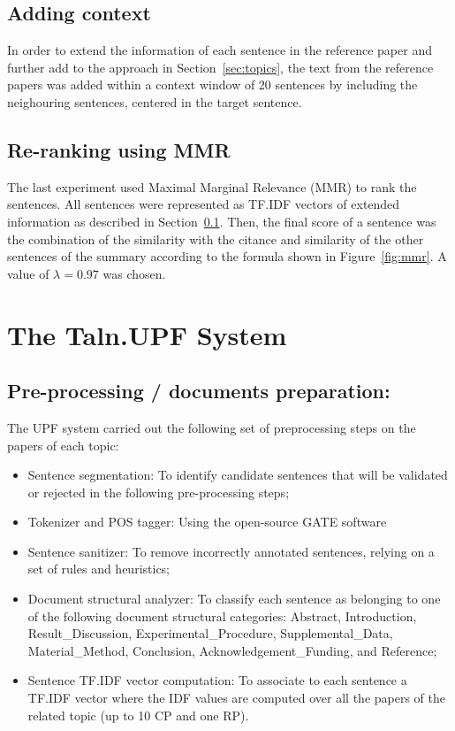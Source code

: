 \documentclass[11pt]{article}
\begin{document}
\subsection{Adding context}
\label{sec:context}
In order to  extend the information of each sentence in the reference paper 
and further add to the approach in Section~\ref{sec:topics}, the text from 
the reference papers was added within a context window of 20 sentences by 
including the neighouring sentences, centered in the target sentence.


\subsection{Re-ranking using MMR}
\label{sec:mmr}
The last experiment used Maximal Marginal Relevance (MMR) \cite{Carbonell:1998} 
to rank the sentences. All sentences were represented as TF.IDF vectors 
of extended information as described in Section~\ref{sec:context}. Then, the 
final score of a sentence was the combination of the similarity with the 
citance and similarity of the other sentences of the summary according to the 
formula shown in Figure~\ref{fig:mmr}. A value of $\lambda=0.97$ was chosen.

\section{The Taln.UPF System}

\subsection{Pre-processing / documents preparation:}
The UPF system carried out the following set of preprocessing steps on the 
papers of each topic:
\begin{itemize}
\item{Sentence segmentation:} To identify candidate sentences that will be 
validated or rejected in the following pre-processing steps;
\item{Tokenizer and POS tagger:} Using the open-source GATE software
\item{Sentence sanitizer:} To remove incorrectly annotated sentences, 
relying on a set of rules and heuristics;
\item{Document structural analyzer:} To classify each sentence as belonging 
to one of the following document structural categories: Abstract, 
Introduction, Result\_Discussion, Experimental\_Procedure, 
Supplemental\_Data, Material\_Method, Conclusion, Acknowledgement\_Funding, 
and Reference;
\item{Sentence TF.IDF vector computation:} To associate to each sentence a 
TF.IDF vector where the IDF values are computed over all the papers of the 
related topic (up to 10 CP and one RP).
\end{itemize}
\end{document}
